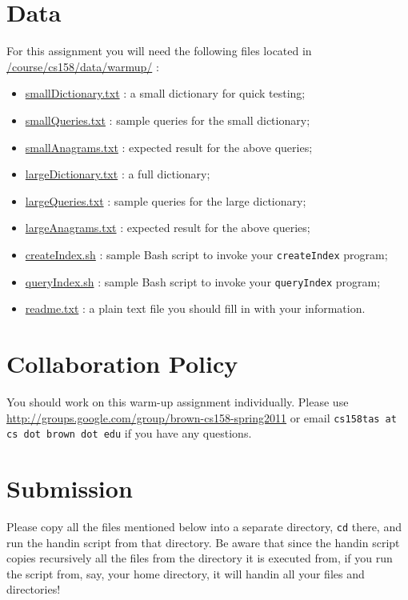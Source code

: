 \documentclass[10pt]{article}
\newcommand{\file}[1]{\texttt{#1}}
\newcommand{\code}[1]{\texttt{#1}}
\begin{document}
\section{Data}
\label{data}

For this assignment you will need the following files located in
\url{/course/cs158/data/warmup/} :
\begin{itemize}
	\item \url{smallDictionary.txt} : a small dictionary for quick testing;
	\item \url{smallQueries.txt} : sample queries for the small dictionary;
	\item \url{smallAnagrams.txt} : expected result for the above queries;
	\item \url{largeDictionary.txt} : a full dictionary;
	\item \url{largeQueries.txt} : sample queries for the large dictionary;
	\item \url{largeAnagrams.txt} : expected result for the above queries;
	\item \url{createIndex.sh} : sample Bash script to invoke your \file{createIndex} program;
	\item \url{queryIndex.sh} : sample Bash script to invoke your \file{queryIndex} program;
	\item \url{readme.txt} : a plain text file you should fill in with your information.
\end{itemize}


\section{Collaboration Policy}
\label{collab}



You should work on this warm-up assignment individually.
Please use \url{http://groups.google.com/group/brown-cs158-spring2011} or
email \texttt{cs158tas at cs dot brown dot edu} if you have any questions.


\section{Submission}
\label{submission}
Please copy all the files mentioned below
into a separate directory, \code{cd} there, and
run the handin script from that directory.
Be aware that since the handin script copies recursively
all the files from the directory it is executed from,
if you run the script from, say, your home directory,
it will handin all your files and directories!
\end{document}
